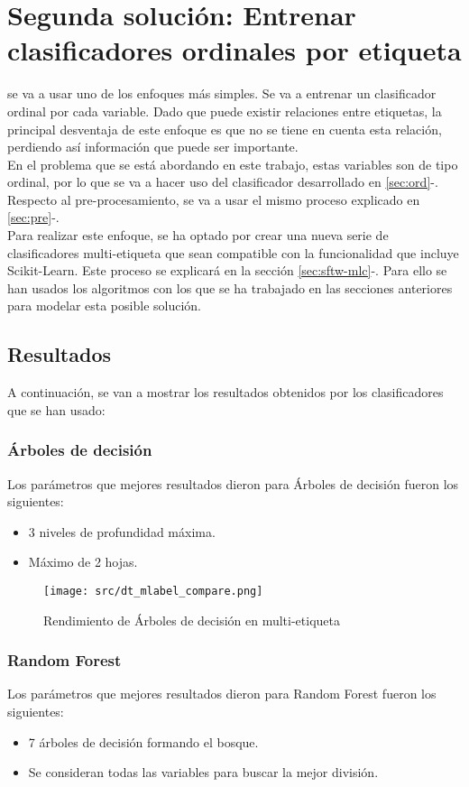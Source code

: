 \section{Segunda solución: Entrenar clasificadores ordinales por etiqueta}
se va a usar uno de los enfoques más simples. Se va a entrenar un clasificador ordinal por cada variable.
Dado que puede existir relaciones entre etiquetas, la principal desventaja de este enfoque es que no se tiene en cuenta esta relación, perdiendo así información que puede ser importante.\\
\linebreak
En el problema que se está abordando en este trabajo, estas variables son de tipo ordinal, por lo que se va a hacer uso del clasificador desarrollado en \ref{sec:ord}-.
Respecto al pre-procesamiento, se va a usar el mismo proceso explicado en \ref{sec:pre}-.\\

Para realizar este enfoque, se ha optado por crear una nueva serie de clasificadores multi-etiqueta que sean compatible con la funcionalidad que incluye Scikit-Learn. Este proceso se explicará en la sección \ref{sec:sftw-mlc}-. Para ello se han usados los algoritmos con los que se ha trabajado en las secciones anteriores para modelar esta posible solución.
\subsection{Resultados}
A continuación, se van a mostrar los resultados obtenidos por los clasificadores que se han usado:
\subsubsection*{Árboles de decisión}
Los parámetros que mejores resultados dieron para Árboles de decisión fueron los siguientes:
\begin{itemize}
	\item 3 niveles de profundidad máxima.
	\item Máximo de 2 hojas.
\end{itemize}
\begin{figure}[H]
	\centering
	\texttt{[image: src/dt\_mlabel\_compare.png]}
	\caption{Rendimiento de Árboles de decisión en multi-etiqueta}
	\label{fig:dtml_cmp}
\end{figure}
\subsubsection*{Random Forest}
Los parámetros que mejores resultados dieron para Random Forest fueron los siguientes:
\begin{itemize}
	\item 7 árboles de decisión formando el bosque.
	\item Se consideran todas las variables para buscar la mejor división.
\end{itemize}

